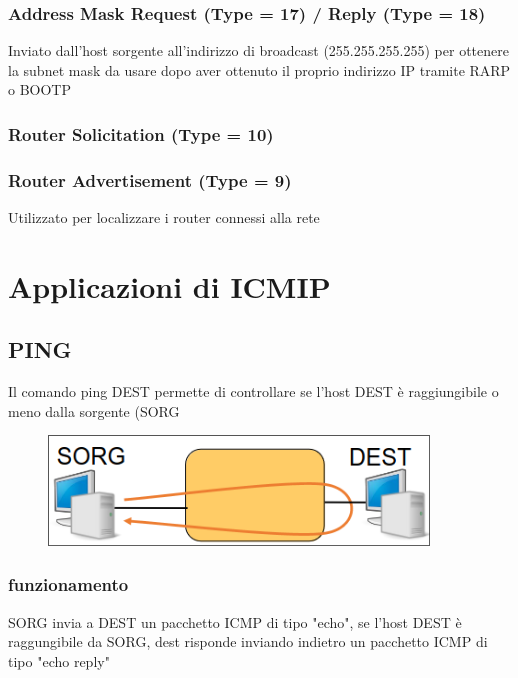 \documentclass{report}
\begin{document}
            \subsection{Address Mask Request (Type = 17) / Reply (Type = 18)}
                Inviato dall'host sorgente all'indirizzo di broadcast (255.255.255.255)
                per ottenere la subnet mask da usare dopo aver ottenuto il proprio indirizzo IP tramite RARP o BOOTP
            \subsection{Router Solicitation (Type = 10)} 
            \subsection{Router Advertisement (Type = 9)}
                Utilizzato per localizzare i router connessi alla rete
    \chapter{Applicazioni di ICMIP}
        \section{PING}
            Il comando ping DEST permette di controllare se l'host DEST è raggiungibile o meno dalla sorgente (SORG
            \begin{figure}[H]
                \includegraphics[width=0.9\textwidth]{2/ping.png}
            \end{figure}
            \subsection{funzionamento}
                SORG invia a DEST un pacchetto ICMP di tipo "echo", se l'host DEST è raggungibile da SORG, dest risponde inviando indietro un pacchetto ICMP di tipo "echo reply"
\end{document}
